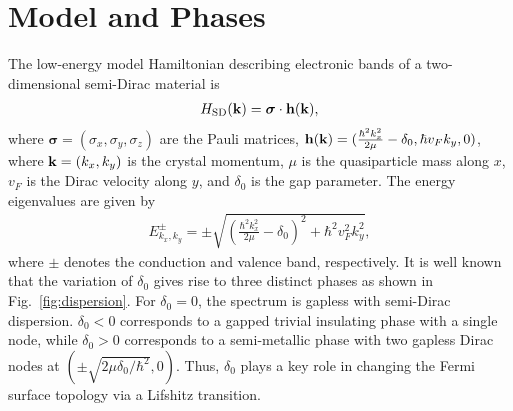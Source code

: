 \documentclass[aps,prb,showpacs,twocolumn,floats]{revtex4-1}
\begin{document}
\section{Model and Phases}
The low-energy model Hamiltonian describing electronic bands of a two-dimensional semi-Dirac material is \cite{del,banerjee,montam}
\begin{align}
H_{\rm SD}(\bf k)={\boldsymbol \sigma}\cdot{\bf h(\bf k)} ,
\label{ham0}
\end{align}
where ${\boldsymbol \sigma}=(\sigma_x,\sigma_y,\sigma_z)$ are the Pauli matrices, $ {\bf h (\bf k)}=(\frac{\hbar^2  k_x^2}{2\mu}-\delta_0,\hbar v_F k_y,0)$,
where ${\bf k}=(k_x, k_y)$ is the crystal momentum,  $\mu$ is the quasiparticle mass along $x$, $v_F$ is the Dirac velocity along $y$, and $\delta_0$ is the gap parameter. The energy eigenvalues are given by
\begin{align}
E^{\pm}_{k_x,k_y}=\pm \sqrt{\left(\frac{\hbar^2 k_x^2}{2\mu}-\delta_0\right)^2+\hbar^2v_F^2 k_y^2},
\label{eq:eval}
\end{align}
where $\pm$ denotes the conduction and valence band, respectively. It is well known that the variation of $\delta_0$ gives rise to three distinct phases as shown in Fig.~\ref{fig:dispersion}.  For $\delta_0=0$, the spectrum is gapless with semi-Dirac dispersion. $\delta_0<0$ corresponds to a gapped trivial insulating phase with a single node, while $\delta_0>0$ corresponds to a semi-metallic phase with two gapless Dirac nodes at $(\pm \sqrt{2\mu\delta_0/\hbar^2},0)$. Thus, $\delta_0$ plays a key role in changing the Fermi surface topology via a Lifshitz transition.
\end{document}
